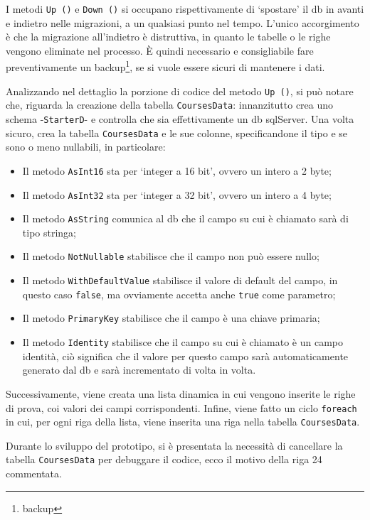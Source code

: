 I metodi \texttt{Up ()} e \texttt{Down ()} si occupano rispettivamente di `spostare' il \acrshort{db} in avanti e indietro nelle migrazioni, a un qualsiasi punto nel tempo. L'unico accorgimento è che la migrazione all'indietro è distruttiva, in quanto le tabelle o le righe vengono eliminate nel processo. È quindi necessario e consigliabile fare preventivamente un backup\footnote{\glsdesc{backup}}, se si vuole essere sicuri di mantenere i dati.

Analizzando nel dettaglio la porzione di codice del metodo \texttt{Up ()}, si può notare che, riguarda la creazione della tabella \texttt{CoursesData}: innanzitutto crea uno schema -\texttt{StarterD}- e controlla che sia effettivamente un \acrshort{db} \acrshort{sql}Server. Una volta sicuro, crea la tabella \texttt{CoursesData} e le sue colonne, specificandone il tipo e se sono o meno nullabili, in particolare:
\begin{itemize}
  \item Il metodo \texttt{AsInt16} sta per `integer a 16 bit', ovvero un intero a 2 byte;
  \item Il metodo \texttt{AsInt32} sta per `integer a 32 bit', ovvero un intero a 4 byte;
  \item Il metodo \texttt{AsString} comunica al \acrshort{db} che il campo su cui è chiamato sarà di tipo stringa;
  \item Il metodo \texttt{NotNullable} stabilisce che il campo non può essere nullo;
  \item Il metodo \texttt{WithDefaultValue} stabilisce il valore di default del campo, in questo caso \texttt{false}, ma ovviamente accetta anche \texttt{true} come parametro;
  \item Il metodo \texttt{PrimaryKey} stabilisce che il campo è una chiave primaria;
  \item Il metodo \texttt{Identity} stabilisce che il campo su cui è chiamato è un campo identità, ciò significa che il valore per questo campo sarà automaticamente generato dal \acrshort{db} e sarà incrementato di volta in volta.
\end{itemize}

Successivamente, viene creata una lista dinamica in cui vengono inserite le righe di prova, coi valori dei campi corrispondenti. Infine, viene fatto un ciclo \texttt{foreach} in cui, per ogni riga della lista, viene inserita una riga nella tabella \texttt{CoursesData}.

Durante lo sviluppo del prototipo, si è presentata la necessità di cancellare la tabella \texttt{CoursesData} per debuggare il codice, ecco il motivo della riga 24 commentata.

